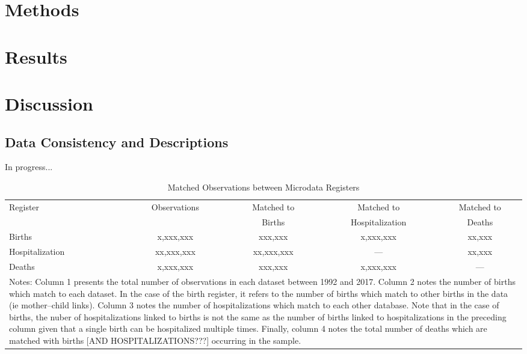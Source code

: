 \documentclass[11pt]{article}
\begin{document}
\begin{spacing}{1.5}
  

  
  \clearpage
  \section{Methods}

  \clearpage
  \section{Results}

  \clearpage
  \section{Discussion}

  \clearpage
  
  
  \clearpage
  \begin{appendices}
  \setcounter{page}{1}
  \renewcommand{\thepage}{A\arabic{page}}
  \setcounter{table}{0}
  \renewcommand{\thetable}{A\arabic{table}}
  \setcounter{figure}{0}
  \renewcommand{\thefigure}{A\arabic{figure}}



  \section{Data Consistency and Descriptions}
  \label{app:data}
  In progress...


  \begin{table}[htpb!]
    \centering
    \caption{Matched Observations between Microdata Registers}
    \begin{tabular}{lcccc} \toprule
      Register & Observations & Matched to & Matched to  & Matched to \\
               &              & Births     & Hospitalization & Deaths \\ \midrule
      Births          & x,xxx,xxx  & xxx,xxx    & x,xxx,xxx & xx,xxx \\
      Hospitalization & xx,xxx,xxx & xx,xxx,xxx & ---       & xx,xxx \\
      Deaths          & x,xxx,xxx  & xxx,xxx    & x,xxx,xxx & ---    \\ \midrule
      \multicolumn{5}{p{12.4cm}}{\footnotesize Notes: Column 1 presents the
        total number of observations in each dataset between 1992 and 2017.
        Column 2 notes the number of births which match to each dataset.  In the
        case of the birth register, it refers to the number of births which match
        to other births in the data (ie mother--child links). Column 3 notes the
        number of hospitalizations which match to each other database.  Note that
        in the case of births, the nuber of hospitalizations linked to births is not
        the same as the number of births linked to hospitalizations in the preceding
        column given that a single birth can be hospitalized multiple times.  Finally,
        column 4 notes the total number of deaths which are matched with births
        [AND HOSPITALIZATIONS???] occurring in the sample.}
    \end{tabular}
  \end{table}



\end{appendices}
\end{spacing}
\end{document}
